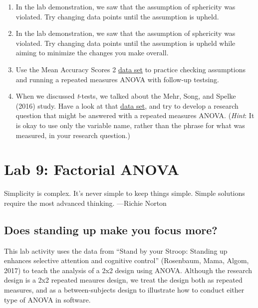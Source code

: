 \documentclass[
]{book}
\begin{document}
\begin{enumerate}
\def\labelenumi{\arabic{enumi}.}
\item
  In the lab demonstration, we saw that the assumption of sphericity was violated. Try changing data points until the assumption is upheld.
\item
  In the lab demonstration, we saw that the assumption of sphericity was violated. Try changing data points until the assumption is upheld while aiming to minimize the changes you make overall.
\item
  Use the Mean Accuracy Scores 2 \href{https://moodle.stfx.ca/mod/resource/view.php?id=926491}{data set} to practice checking assumptions and running a repeated measures ANOVA with follow-up testsing.
\item
  When we discussed \emph{t}-tests, we talked about the Mehr, Song, and Spelke (2016) study. Have a look at that \href{https://moodle.stfx.ca/mod/resource/view.php?id=901715}{data set}, and try to develop a research question that might be answered with a repeated measures ANOVA. (\emph{Hint}: It is okay to use only the variable name, rather than the phrase for what was measured, in your research question.)
\end{enumerate}

\hypertarget{lab-9-factorial-anova}{%
\chapter{Lab 9: Factorial ANOVA}\label{lab-9-factorial-anova}}

{
Simplicity is complex. It's never simple to keep things simple. Simple solutions require the most advanced thinking.
---Richie Norton
}

\hypertarget{does-standing-up-make-you-focus-more}{%
\section{Does standing up make you focus more?}\label{does-standing-up-make-you-focus-more}}

This lab activity uses the data from ``Stand by your Stroop: Standing up enhances selective attention and cognitive control'' (Rosenbaum, Mama, Algom, 2017) to teach the analysis of a 2x2 design using ANOVA. Although the research design is a 2x2 repeated meaures design, we treat the design both as repeated measures, and as a between-subjects design to illustrate how to conduct either type of ANOVA in software.
\end{document}
